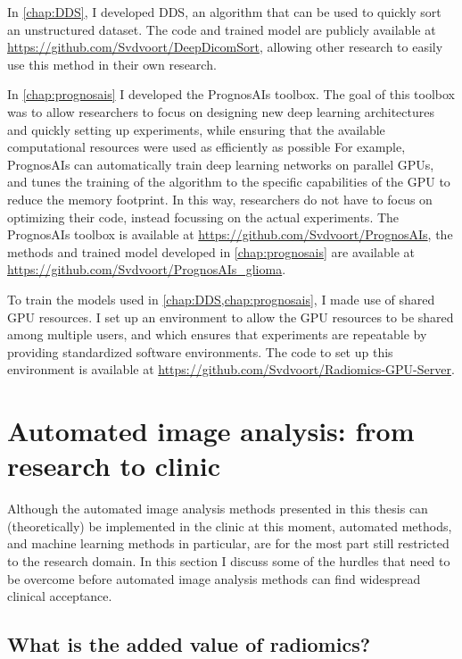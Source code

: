In \cref{chap:DDS}, I developed \acrlong{DDS}, an algorithm that can be used to quickly sort an unstructured dataset.
The code and trained model are publicly available at \url{https://github.com/Svdvoort/DeepDicomSort}, allowing other research to easily use this method in their own research.


In \cref{chap:prognosais} I developed the PrognosAIs toolbox.
The goal of this toolbox was to allow researchers to focus on designing new deep learning architectures and quickly setting up experiments, while ensuring that the available computational resources were used as efficiently as possible
For example, PrognosAIs can automatically train deep learning networks on parallel GPUs, and tunes the training of the algorithm to the specific capabilities of the GPU to reduce the memory footprint.
In this way, researchers do not have to focus on optimizing their code, instead focussing on the actual experiments.
The PrognosAIs toolbox is available at \url{https://github.com/Svdvoort/PrognosAIs}, the methods and trained model developed in \cref{chap:prognosais} are available at \url{https://github.com/Svdvoort/PrognosAIs_glioma}.

To train the models used in \cref{chap:DDS,chap:prognosais}, I made use of shared GPU resources.
I set up an environment to allow the GPU resources to be shared among multiple users, and which ensures that experiments are repeatable by providing standardized software environments.
The code to set up this environment is available at \url{https://github.com/Svdvoort/Radiomics-GPU-Server}.




\section{Automated image analysis: from research to clinic}\label{sec:discussion_clinical}

Although the automated image analysis methods presented in this thesis can (theoretically) be implemented in the clinic at this moment, automated methods, and machine learning methods in particular, are for the most part still restricted to the research domain.
In this section I discuss some of the hurdles that need to be overcome before automated image analysis methods can find widespread clinical acceptance.

\subsection{What is the added value of radiomics?}\label{subsec:discussion_added_value_radiomics}

